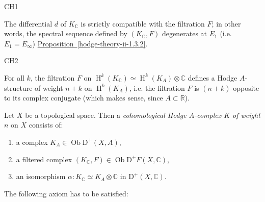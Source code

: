     \begin{axiom}{CH1}\label{hodge-theory-iii-8.1.1-ch1}\skipsinglepar\par{}The differential \(d\) of \(K_\mathbb {C}\) is strictly compatible with the filtration \(F\);
        in other words, the spectral sequence defined by \((K_\mathbb {C},F)\) degenerates at \(E_1\) (i.e. \(E_1=E_\infty \)) \hyperref[hodge-theory-ii-1.3.2]{Proposition~\ref*{hodge-theory-ii-1.3.2}}.\end{axiom}

    \begin{axiom}{CH2}\label{hodge-theory-iii-8.1.1-ch2}\skipsinglepar\par{}For all \(k\), the filtration \(F\) on \(\operatorname {H}^k(K_\mathbb {C})\simeq \operatorname {H}^k(K_A)\otimes \mathbb {C}\) defines a Hodge \(A\)-structure of weight \(n+k\) on \(\operatorname {H}^k(K_A)\), i.e. the filtration \(F\) is \((n+k)\)-opposite to its complex conjugate (which makes sense, since \(A\subset \mathbb {R}\)).\end{axiom}\label{hodge-theory-iii-8.1.2}\par{}Let \(X\) be a topological space.
    Then a \emph{cohomological Hodge \(A\)-complex \(K\) of weight \(n\)} on \(X\) consists of:

    
 \begin{enumerate}
      
 \item[(𝛼)]
        a complex \(K_A\in \operatorname {Ob}\mathrm {D}^+(X,A)\),
      

      
 \item[(𝛽)]
        a filtered complex \((K_\mathbb {C},F)\in \operatorname {Ob}\mathrm {D}^+F(X,\mathbb {C})\),
      

      
 \item[(𝛾)]
        an isomorphism \(\alpha \colon  K_\mathbb {C}\simeq  K_A\otimes \mathbb {C}\) in \(\mathrm {D}^+(X,\mathbb {C})\).
      

    \end{enumerate}\par{}The following axiom has to be satisfied:

